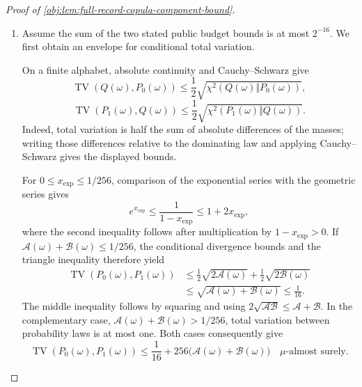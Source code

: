 \documentclass[11pt]{article}
\begin{document}
\begin{proof}[Proof of \cref{obj:lem:full-record-copula-component-bound}]
\begin{enumerate}
For a fixed latent draw and covariate \(x\), the flag and fair-label weights give
\[
\Pr_\nu\left(
 A=\frac{1+z^{\mathrm t}}2,\,
 Y=z^{\mathrm y}L\mid x
 \right)
 =
 \frac{\varepsilon}{4}
 \left\{
 1+z^{\mathrm t}\xi(x)+z^{\mathrm y}\upsilon(x)
   +z^{\mathrm t}z^{\mathrm y}\zeta(x)
 \right\},
\]
and, summing the retained outcome-sign label when the flag is zero,
\[
\Pr_\nu\left(
 A=\frac{1+z^{\mathrm t}}2,\,
 Y=0\mid x
 \right)
 =
 \sum_{z^{\mathrm y}\in\{-1,1\}}
 \frac{1-\varepsilon}{4}(1+z^{\mathrm t}\xi(x))
 =
 \frac{1-\varepsilon}{2}(1+z^{\mathrm t}\xi(x)).
\]
These are exactly the categories of \cref{obj:def:marked-table}. Independent record generation conditional on the latent draw, followed by its prior average, therefore proves
\[
(\mu\otimes P_0)\circ\mathsf O_L^{-1}=\mathbb P_0,
\qquad
(\mu\otimes P_1)\circ\mathsf O_L^{-1}=\mathbb P_1.
\]

\item
Assume the sum of the two stated public budget bounds is at most \(2^{-16}\). We first obtain an envelope for conditional total variation.

On a finite alphabet, absolute continuity and Cauchy--Schwarz give
\[
\operatorname{TV}(Q(\omega),P_0(\omega))
 \le\frac12\sqrt{\chi^2(Q(\omega)\Vert P_0(\omega))},
\]
\[
\operatorname{TV}(P_1(\omega),Q(\omega))
 \le\frac12\sqrt{\chi^2(P_1(\omega)\Vert Q(\omega))}.
\]
Indeed, total variation is half the sum of absolute differences of the masses; writing those differences relative to the dominating law and applying Cauchy--Schwarz gives the displayed bounds.

For \(0\le x_{\mathrm{exp}}\le1/256\), comparison of the exponential series with the geometric series gives
\[
e^{x_{\mathrm{exp}}}
 \le\frac1{1-x_{\mathrm{exp}}}
 \le1+2x_{\mathrm{exp}},
\]
where the second inequality follows after multiplication by
\(1-x_{\mathrm{exp}}>0\). If
\(\mathcal A(\omega)+\mathcal B(\omega)\le1/256\), the conditional divergence bounds and the triangle inequality therefore yield
\[
\begin{aligned}
\operatorname{TV}(P_0(\omega),P_1(\omega))
 &\le
 \frac12\sqrt{2\mathcal A(\omega)}
 +\frac12\sqrt{2\mathcal B(\omega)}\\
 &\le\sqrt{\mathcal A(\omega)+\mathcal B(\omega)}
 \le\frac1{16}.
\end{aligned}
\]
The middle inequality follows by squaring and using
\(2\sqrt{\mathcal A\mathcal B}\le\mathcal A+\mathcal B\).
In the complementary case,
\(\mathcal A(\omega)+\mathcal B(\omega)>1/256\), total variation between probability laws is at most one. Both cases consequently give
\[
\operatorname{TV}(P_0(\omega),P_1(\omega))
 \le\frac1{16}
      +256\bigl(\mathcal A(\omega)+\mathcal B(\omega)\bigr)
\quad\mu\text{-almost surely}.
\]


\end{enumerate}
\end{proof}
\end{document}
